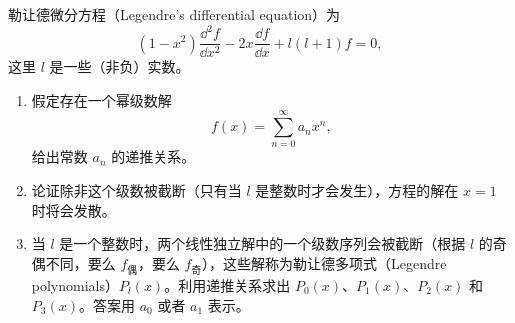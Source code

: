 勒让德微分方程（Legendre's differential equation）为
\[
(1-x^2)\frac{\dd^2f}{\dd x^2}-2x\frac{\dd f}{\dd x}+l(l+1)f=0,
\]
这里 $l$ 是一些（非负）实数。
\begin{enumerate}
\item 假定存在一个幂级数解
\[
f(x)=\sum_{n=0}^{\infty}a_nx^n,
\]
给出常数 $a_n$ 的递推关系。
\item 论证除非这个级数被截断（只有当 $l$ 是整数时才会发生），方程的解在 $x=1$ 时将会发散。
\item 当 $l$ 是一个整数时，两个线性独立解中的一个级数序列会被截断（根据 $l$ 的奇偶不同，要么 $f_{\text{偶}}$，要么 $f_{\text{奇}}$），这些解称为勒让德多项式（Legendre polynomials）$P_l(x)$。利用递推关系求出 $P_0(x)$、$P_1(x)$、$P_2(x)$ 和 $P_3(x)$。答案用 $a_0$ 或者 $a_1$ 表示。
\end{enumerate}
\vfill
